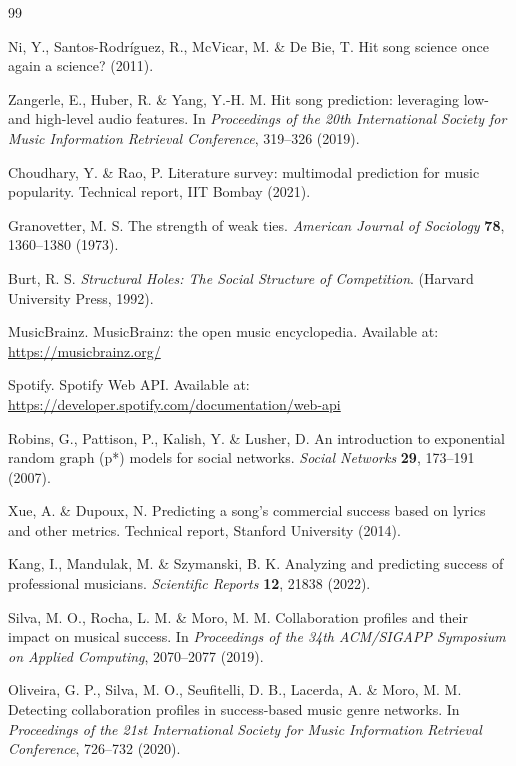 \documentclass[fleqn,10pt]{wlscirep}
\begin{document}
\begin{thebibliography}{99}

Ni, Y., Santos-Rodríguez, R., McVicar, M. \& De Bie, T. 
Hit song science once again a science? (2011).

Zangerle, E., Huber, R. \& Yang, Y.-H. M. 
Hit song prediction: leveraging low- and high-level audio features. 
In \textit{Proceedings of the 20th International Society for Music Information Retrieval Conference}, 319--326 (2019).

Choudhary, Y. \& Rao, P. 
Literature survey: multimodal prediction for music popularity. 
Technical report, IIT Bombay (2021).

Granovetter, M. S. 
The strength of weak ties. 
\textit{American Journal of Sociology} \textbf{78}, 1360--1380 (1973).

Burt, R. S. 
\textit{Structural Holes: The Social Structure of Competition}. 
(Harvard University Press, 1992).

MusicBrainz. 
MusicBrainz: the open music encyclopedia. 
Available at: \url{https://musicbrainz.org/}

Spotify. 
Spotify Web API. 
Available at: \url{https://developer.spotify.com/documentation/web-api}

Robins, G., Pattison, P., Kalish, Y. \& Lusher, D. 
An introduction to exponential random graph (p*) models for social networks. 
\textit{Social Networks} \textbf{29}, 173--191 (2007).

Xue, A. \& Dupoux, N. 
Predicting a song’s commercial success based on lyrics and other metrics. 
Technical report, Stanford University (2014).

Kang, I., Mandulak, M. \& Szymanski, B. K. 
Analyzing and predicting success of professional musicians. 
\textit{Scientific Reports} \textbf{12}, 21838 (2022).

Silva, M. O., Rocha, L. M. \& Moro, M. M. 
Collaboration profiles and their impact on musical success. 
In \textit{Proceedings of the 34th ACM/SIGAPP Symposium on Applied Computing}, 2070--2077 (2019).

Oliveira, G. P., Silva, M. O., Seufitelli, D. B., Lacerda, A. \& Moro, M. M. 
Detecting collaboration profiles in success-based music genre networks. 
In \textit{Proceedings of the 21st International Society for Music Information Retrieval Conference}, 726--732 (2020).


\end{thebibliography}
\end{document}
